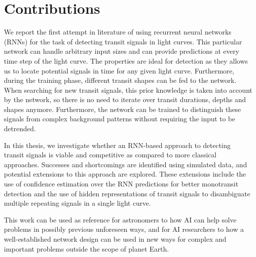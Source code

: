 
\section{Contributions}

We report the first attempt in literature of using recurrent neural networks (RNNs) for the task of detecting transit signals in light curves. This particular network can handle arbitrary input sizes and can provide predictions at every time step of the light curve. The properties are ideal for detection as they allows us to locate potential signals in time for any given light curve. Furthermore, during the training phase, different transit shapes can be fed to the network. When searching for new transit signals, this prior knowledge is taken into account by the network, so there is no need to iterate over transit durations, depths and shapes anymore. Furthermore, the network can be trained to distinguish these signals from complex background patterns without requiring the input to be detrended.

In this thesis, we investigate whether an RNN-based approach to detecting transit signals is viable and competitive as compared to more classical approaches. Successes and shortcomings are identified using simulated data, and potential extensions to this approach are explored. These extensions include the use of confidence estimation over the RNN predictions for better monotransit detection and the use of hidden representations of transit signals to disambiguate multiple repeating signals in a single light curve.


This work can be used as reference for astronomers to how AI can help solve problems in possibly previous unforeseen ways, and for AI researchers to how a well-established network design can be used in new ways for complex and important problems outside the scope of planet Earth.